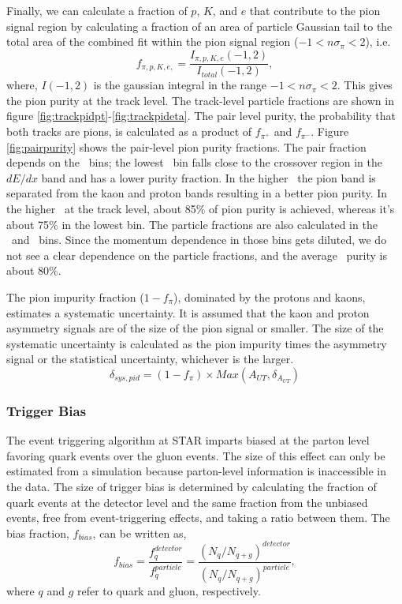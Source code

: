   Finally, we can calculate a fraction of $p$, $K$, and $e$ that contribute to the pion signal region by calculating a fraction of an area of particle Gaussian tail to the total area of the combined fit within the pion signal region ($-1<n\sigma_\pi<2$), i.e.
  \begin{equation}
      f_{\pi,p,K,e,} = \frac{I_{\pi,p,K,e}(-1,2)}{I_{total}(-1,2)},
  \end{equation}
where, $I(-1,2)$ is the gaussian integral in the range $-1<n\sigma_\pi<2$. This gives the pion purity at the track level. The track-level particle fractions are shown in figure \ref{fig:trackpidpt}-\ref{fig:trackpideta}. The pair level purity, the probability that both tracks are pions, is calculated as a product of $f_{\pi^+}$ and $f_{\pi^-}$. Figure \ref{fig:pairpurity} shows the pair-level pion purity fractions. The pair fraction depends on the \ptp\ bins; the lowest \ptp\ bin falls close to the crossover region in the $dE/dx$ band and has a lower purity fraction. In the higher \ptp\, the pion band is separated from the kaon and proton bands resulting in a better pion purity. In the higher \ptp\ at the track level, about 85\% of pion purity is achieved, whereas it's about 75\%  in the lowest bin. The particle fractions are also calculated in the \minv\ and \etap\ bins. Since the momentum dependence in those bins gets diluted, we do not see a clear dependence on the particle fractions, and the average \pip\ purity is about 80\%.    

The pion impurity fraction ($1-f_{\pi}$), dominated by the protons and kaons, estimates a systematic uncertainty. It is assumed that the kaon and proton asymmetry signals are of the size of the pion signal or smaller. The size of the systematic uncertainty is calculated as the pion impurity times the asymmetry signal or the statistical uncertainty, whichever is the larger.
    \begin{equation}
    \delta_{sys,pid} = (1-f_{\pi})\times Max(A_{UT}, \delta_{ A_{UT}})
    \end{equation}

\subsubsection{Trigger Bias}
 The event triggering algorithm at STAR imparts biased at the parton level favoring quark events over the gluon events. The size of this effect can only be estimated from a simulation because parton-level information is inaccessible in the data. The size of trigger bias is determined by calculating the fraction of quark events at the detector level and the same fraction from the unbiased events, free from event-triggering effects, and taking a ratio between them.
The bias fraction, $f_{bias}$, can be written as, 
\begin{equation}
f_{bias}= \frac{f_{q}^{detector}}{f_{q}^{particle}}=\frac{(N_q/N_{q+g})^{detector}}{(N_q/N_{q+g})^{particle}},
\end{equation} 
where $q$ and $g$ refer to quark and gluon, respectively. 

